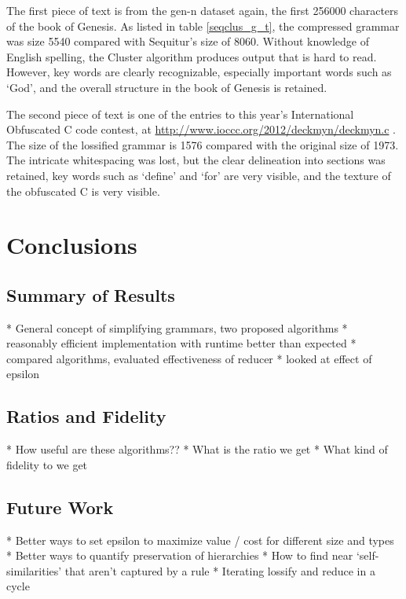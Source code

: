\documentclass[11pt]{article}
\begin{document}
The first piece of text is from the gen-n dataset again, the first 256000 characters
of the book of Genesis. As listed in table \ref{seqclus_g_t}, the compressed grammar
was size 5540 compared with Sequitur's size of 8060. Without knowledge of English 
spelling, the Cluster algorithm produces output that is hard to read. However,
key words are clearly recognizable, especially important words such as `God', and
the overall structure in the book of Genesis is retained.

The second piece of text is one of the entries to this year's International
Obfuscated C code contest, at \url{http://www.ioccc.org/2012/deckmyn/deckmyn.c} .
The size of the lossified grammar is 1576 compared with the original size of
1973. The intricate whitespacing was lost, but the clear delineation into
sections was retained, key words such as `define' and `for' are very visible,
and the texture of the obfuscated C is very visible.

\section{Conclusions}
\subsection{Summary of Results}
* General concept of simplifying grammars, two proposed algorithms
* reasonably efficient implementation with runtime better than expected
* compared algorithms, evaluated effectiveness of reducer
* looked at effect of epsilon

\subsection{Ratios and Fidelity}

* How useful are these algorithms??
* What is the ratio we get
* What kind of fidelity to we get

\subsection{Future Work}
* Better ways to set epsilon to maximize value / cost for different size and types
* Better ways to quantify preservation of hierarchies
* How to find near `self-similarities' that aren't captured by a rule
* Iterating lossify and reduce in a cycle

\pagebreak

\nocite{*}


\end{document}
